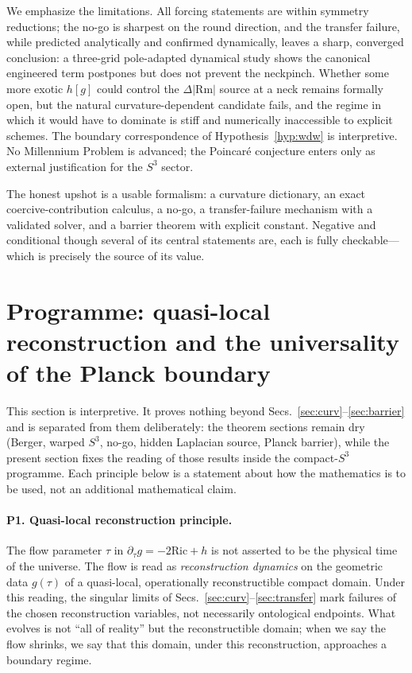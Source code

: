 \documentclass[aps,prd,twocolumn,superscriptaddress,nofootinbib,floatfix]{revtex4-2}
\theoremstyle{plain}
\theoremstyle{definition}
\newcommand{\Rm}{\mathrm{Rm}}
\newcommand{\Ric}{\mathrm{Ric}}
\newcommand{\dtau}{\partial_\tau}
\begin{document}
We emphasize the limitations. All forcing statements are within symmetry reductions; the no-go is sharpest on the round direction, and the transfer failure, while predicted analytically and confirmed dynamically, leaves a sharp, converged conclusion: a three-grid pole-adapted dynamical study shows the canonical engineered term postpones but does not prevent the neckpinch. Whether some more exotic $h[g]$ could control the $\Delta|\Rm|$ source at a neck remains formally open, but the natural curvature-dependent candidate fails, and the regime in which it would have to dominate is stiff and numerically inaccessible to explicit schemes. The boundary correspondence of Hypothesis~\ref{hyp:wdw} is interpretive. No Millennium Problem is advanced; the Poincar\'e conjecture enters only as external justification for the $S^3$ sector.

The honest upshot is a usable formalism: a curvature dictionary, an exact coercive-contribution calculus, a no-go, a transfer-failure mechanism with a validated solver, and a barrier theorem with explicit constant. Negative and conditional though several of its central statements are, each is fully checkable---which is precisely the source of its value.

\section{Programme: quasi-local reconstruction and the universality of the Planck boundary}\label{sec:programme}

This section is interpretive. It proves nothing beyond Secs.~\ref{sec:curv}--\ref{sec:barrier} and is separated from them deliberately: the theorem sections remain dry (Berger, warped $S^3$, no-go, hidden Laplacian source, Planck barrier), while the present section fixes the reading of those results inside the compact-$S^3$ programme. Each principle below is a statement about how the mathematics is to be used, not an additional mathematical claim.

\paragraph*{P1. Quasi-local reconstruction principle.}
The flow parameter $\tau$ in $\dtau g=-2\Ric+h$ is not asserted to be the physical time of the universe. The flow is read as \emph{reconstruction dynamics} on the geometric data $g(\tau)$ of a quasi-local, operationally reconstructible compact domain. Under this reading, the singular limits of Secs.~\ref{sec:curv}--\ref{sec:transfer} mark failures of the chosen reconstruction variables, not necessarily ontological endpoints. What evolves is not ``all of reality'' but the reconstructible domain; when we say the flow shrinks, we say that this domain, under this reconstruction, approaches a boundary regime.
\end{document}
